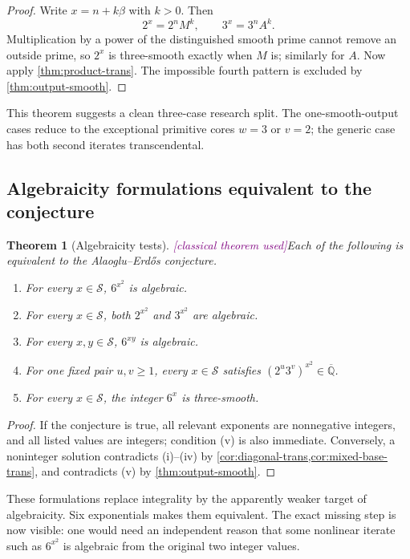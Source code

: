 \documentclass[11pt,oneside]{article}
\newtheorem{theorem}{Theorem}[section]
\theoremstyle{definition}
\newcommand{\Qbar}{\overline{\mathbb Q}}
\newcommand{\Sol}{\mathcal S}
\newcommand{\tagClassical}{\textcolor{Purple}{\textsf{[classical theorem used]}}}
\begin{document}
\begin{proof}
Write \(x=n+k\beta\) with \(k>0\).  Then
\[
  2^x=2^nM^k,
  \qquad 3^x=3^nA^k.
\]
Multiplication by a power of the distinguished smooth prime cannot remove an outside prime,
so \(2^x\) is three-smooth exactly when \(M\) is; similarly for \(A\).  Now apply
\cref{thm:product-trans}.  The impossible fourth pattern is excluded by
\cref{thm:output-smooth}.
\end{proof}

This theorem suggests a clean three-case research split.  The one-smooth-output cases reduce
to the exceptional primitive cores \(w=3\) or \(v=2\); the generic case has both second
iterates transcendental.

\subsection{Algebraicity formulations equivalent to the conjecture}

\begin{theorem}[Algebraicity tests]\label{thm:algebraicity-equivalences}
\tagClassical Each of the following is equivalent to the Alaoglu--Erd\H{o}s conjecture.
\begin{enumerate}[label=\textup{(\roman*)}]
\item For every \(x\in\Sol\), \(6^{x^2}\) is algebraic.
\item For every \(x\in\Sol\), both \(2^{x^2}\) and \(3^{x^2}\) are algebraic.
\item For every \(x,y\in\Sol\), \(6^{xy}\) is algebraic.
\item For one fixed pair \(u,v\ge1\), every \(x\in\Sol\) satisfies
\((2^u3^v)^{x^2}\in\Qbar\).
\item For every \(x\in\Sol\), the integer \(6^x\) is three-smooth.
\end{enumerate}
\end{theorem}

\begin{proof}
If the conjecture is true, all relevant exponents are nonnegative integers, and all listed
values are integers; condition (v) is also immediate.  Conversely, a noninteger solution
contradicts (i)--(iv) by \cref{cor:diagonal-trans,cor:mixed-base-trans}, and contradicts
(v) by \cref{thm:output-smooth}.
\end{proof}

These formulations replace integrality by the apparently weaker target of algebraicity.
Six exponentials makes them equivalent.  The exact missing step is now visible: one would
need an independent reason that some nonlinear iterate such as \(6^{x^2}\) is algebraic
from the original two integer values.
\end{document}
